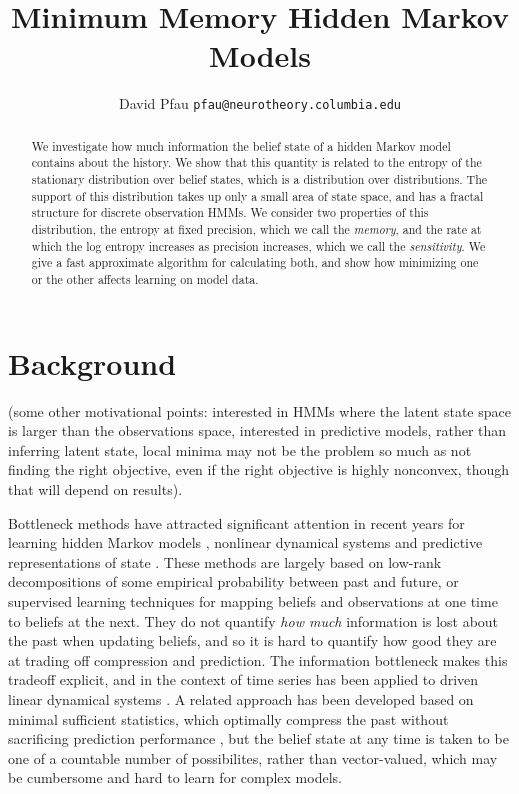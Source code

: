 \documentclass{article} %
\title{Minimum Memory Hidden Markov Models}
\author{
David Pfau
\texttt{pfau@neurotheory.columbia.edu}
}
\begin{document}
\maketitle

\begin{abstract}
We investigate how much information the belief state of a hidden Markov model contains about the history.  We show that this quantity is related to the entropy of the stationary distribution over belief states, which is a distribution over distributions.  The support of this distribution takes up only a small area of state space, and has a fractal structure for discrete observation HMMs.  We consider two properties of this distribution, the entropy at fixed precision, which we call the {\em memory}, and the rate at which the log entropy increases as precision increases, which we call the {\em sensitivity}.  We give a fast approximate algorithm for calculating both, and show how minimizing one or the other affects learning on model data.
\end{abstract}

\section{Background}

(some other motivational points: interested in HMMs where the latent state space is larger than the observations space, interested in predictive models, rather than inferring latent state, local minima may not be the problem so much as not finding the right objective, even if the right objective is highly nonconvex, though that will depend on results).

Bottleneck methods have attracted significant attention in recent years for learning hidden Markov models \cite{Hsu2008, reduced rank hmm?}, nonlinear dynamical systems \cite{Langford2009} and predictive representations of state \cite{Boots2009,Boots2010}.  These methods are largely based on low-rank decompositions of some empirical probability between past and future, or supervised learning techniques for mapping beliefs and observations at one time to beliefs at the next.  They do not quantify {\em how much} information is lost about the past when updating beliefs, and so it is hard to quantify how good they are at trading off compression and prediction.  The information bottleneck \cite{Tishby1998} makes this tradeoff explicit, and in the context of time series has been applied to driven linear dynamical systems \cite{Creutzig2009}.  A related approach has been developed based on minimal sufficient statistics, which optimally compress the past without sacrificing prediction performance \cite{Shalizi2004}, but the belief state at any time is taken to be one of a countable number of possibilites, rather than vector-valued, which may be cumbersome and hard to learn for complex models.
\end{document}
